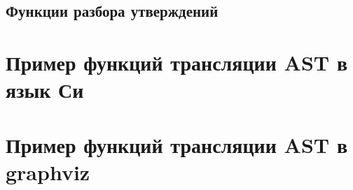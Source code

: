 \subsection*{Функции разбора утверждений}


% 


\section*{Пример функций трансляции AST в язык Си}


\section*{Пример функций трансляции AST в graphviz}




% 





